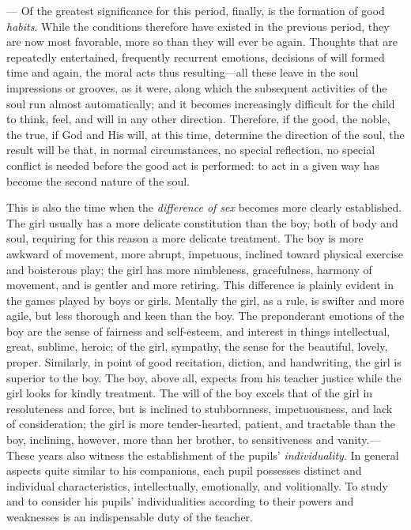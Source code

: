 — Of the greatest significance for this period, finally, is the formation of good \emph{habits}. While the conditions therefore have existed in the previous period, they are now most favorable, more so than they will ever be again. Thoughts that are repeatedly entertained, frequently recurrent emotions, decisions of will formed time and again, the moral acts thus resulting—all these leave in the soul impressions or grooves, as it were, along which the subsequent activities of the soul run almost automatically; and it becomes increasingly difficult for the child to think, feel, and will in any other direction. Therefore, if the good, the noble, the true, if God and His will, at this time, determine the direction of the soul, the result will be that, in normal circumstances, no special reflection, no special conflict is needed before the good act is performed: to act in a given way has become the second nature of the soul.

This is also the time when the \emph{difference of sex} becomes more clearly established. The girl usually has a more delicate constitution than the boy, both of body and soul, requiring for this reason a more delicate treatment. The boy is more awkward of movement, more abrupt, impetuous, inclined toward physical exercise and boisterous play; the girl has more nimbleness, gracefulness, harmony of movement, and is gentler and more retiring. This difference is plainly evident in the games played by boys or girls. Mentally the girl, as a rule, is swifter and more agile, but less thorough and
keen than the boy. The preponderant emotions of the boy are the sense of fairness and self-esteem, and interest in things intellectual, great, sublime, heroic; of the girl, sympathy, the sense for the beautiful, lovely, proper. Similarly, in point of good recitation, diction, and handwriting, the girl is superior to the boy. The boy, above all, expects from his teacher justice while the girl looks for kindly treatment. The will of the boy excels that of the girl in resoluteness and force, but is inclined to stubbornness, impetuousness, and lack of consideration; the girl is more tender-hearted, patient, and tractable than the boy, inclining, however, more than her brother, to sensitiveness and vanity.—These years also witness the establishment of the pupils’ \emph{individuality}. In general aspects quite similar to his companions, each pupil possesses distinct and individual characteristics, intellectually, emotionally, and volitionally. To study and to consider his pupils’ individualities according to their powers and weaknesses is an indispensable duty of the teacher.

